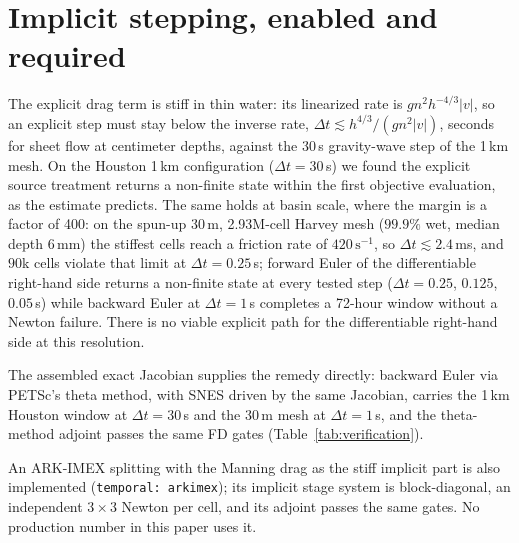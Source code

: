 \documentclass[11pt]{article}
\begin{document}
\section{Implicit stepping, enabled and required}
\label{sec:implicit}

The explicit drag term is stiff in thin water: its linearized rate is
$g n^2 h^{-4/3}|v|$, so an explicit step must stay below the inverse
rate, $\Delta t \lesssim h^{4/3}/(g n^2 |v|)$, seconds for sheet flow
at centimeter depths, against the $30$\,s gravity-wave
step of the 1\,km mesh. On the Houston 1\,km configuration
($\Delta t = 30$\,s) we found the explicit source treatment returns a
non-finite state within the first objective evaluation, as the
estimate predicts. The same holds at basin scale, where the margin is
a factor of 400: on the spun-up 30\,m, 2.93M-cell Harvey mesh
($99.9\%$ wet, median depth 6\,mm) the stiffest cells reach a friction
rate of $420\,\mathrm{s^{-1}}$, so $\Delta t \lesssim 2.4$\,ms, and
$90$k cells violate that limit at $\Delta t = 0.25$\,s; forward Euler of the differentiable
right-hand side returns a non-finite state at every tested step
($\Delta t = 0.25$, $0.125$, $0.05$\,s) while backward Euler at
$\Delta t = 1$\,s completes a 72-hour window without a Newton
failure. There is no viable explicit path for the differentiable
right-hand side at this resolution.

The assembled exact Jacobian supplies the remedy directly: backward
Euler via PETSc's theta method, with SNES driven by the same Jacobian,
carries the 1\,km Houston window at $\Delta t = 30$\,s and the 30\,m
mesh at $\Delta t = 1$\,s, and the theta-method adjoint passes the
same FD gates (Table~\ref{tab:verification}).

An ARK-IMEX splitting with the Manning drag as the stiff implicit part
is also implemented (\texttt{temporal: arkimex}); its implicit stage
system is block-diagonal, an independent $3\times3$ Newton per cell,
and its adjoint passes the same gates. No production number in this
paper uses it.
\end{document}
